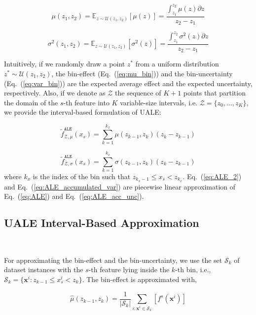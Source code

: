 \documentclass[twoside]{article}
\newcommand{\dfdx}{f^s}
\begin{document}
\begin{equation}
  \label{eq:mu_bin}
    \mu(z_1, z_2) = \mathbb{E}_{z \sim \mathcal{U}(z_1,z_2)} [\mu(z)]
    = \frac{\int_{z_1}^{z_2} \mu(z) \partial z}{z_2 - z_1}
\end{equation}

\begin{equation}
  \label{eq:var_bin}
  \sigma^2(z_1, z_2) = \mathbb{E}_{z \sim \mathcal{U}(z_1,z_2)} [\sigma^2(z)] =  \frac{\int_{z_1}^{z_2} \sigma^2(z)  \partial z}{z_2 - z_1}
\end{equation}

%
Intuitively, if we randomly draw a point \(z^*\) from a uniform distribution \(z^* \sim \mathcal{U}(z_1, z_2)\), the bin-effect (Eq.~(\ref{eq:mu_bin})) and the bin-uncertainty (Eq.~(\ref{eq:var_bin})) are the expected average effect and the expected uncertainty, respectively. Also, if we denote as \(\mathcal{Z}\) the sequence of \(K+1\) points that partition the domain of the \(s\)-th feature into \(K\) variable-size intervals, i.e.  \(\mathcal{Z} = \{z_0, \ldots, z_K\}\), we provide the interval-based formulation of UALE:

\begin{equation}
  \label{eq:ALE_2}
  \tilde{f}^{\mathtt{ALE}}_{\mathcal{Z}, \mu}(x_s) = \sum_{k=1}^{k_x} \mu(z_{k-1}, z_k) (z_k - z_{k-1})
\end{equation}

\begin{equation}
  \label{eq:ALE_accumulated_var}
  \tilde{f}^{\mathtt{ALE}}_{\mathcal{Z}, \sigma}(x_s) =  \sum_{k=1}^{k_x} \sigma(z_{k-1}, z_k) (z_k - z_{k-1})
\end{equation}
%
where \(k_x\) is the index of the bin such that
\( z_{k_x - 1} \leq x_s < z_{k_x}\). Eq.~(\ref{eq:ALE_2}) and
Eq.~(\ref{eq:ALE_accumulated_var}) are piecewise linear approximation
of Eq.~(\ref{eq:ALE}) and Eq.~(\ref{eq:ALE_acc_unc}).

\subsection{UALE Interval-Based Approximation}
~\label{sec:UALE-approximation}

For approximating the bin-effect and the bin-uncertainty, we use the
set \(\mathcal{S}_k\) of dataset instances with the \(s\)-th feature
lying inside the \(k\)-th bin, i.e.,
\( \mathcal{S}_k= \{ \mathbf{x}^i : z_{k-1} \leq x^i_s < z_k \}
\). The bin-effect is approximated with,

\begin{equation}
  \label{eq:mu_bin_approx}
  \hat{\mu}(z_{k-1}, z_k) = \frac{1}{|\mathcal{S}_k|}
  \sum_{i:\mathbf{x}^i \in \mathcal{S}_k} \left [ \dfdx(\mathbf{x}^i)
  \right ]
\end{equation}
\end{document}
